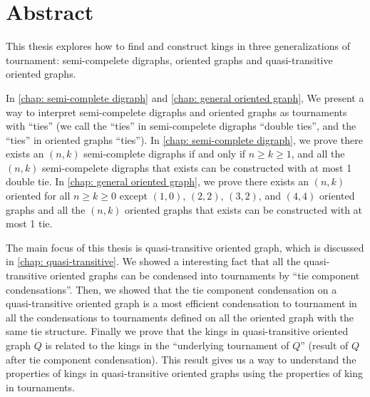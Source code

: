 \chapter{Abstract}

This thesis explores how to find and construct kings
in three generalizations of tournament:
semi-compelete digraphs, oriented graphs and
quasi-transitive oriented graphs.

In \cref{chap: semi-complete digraph} and \cref{chap: general oriented graph},
We present a way to interpret semi-compelete digraphs
and oriented graphs as tournaments with ``ties''
(we call the ``ties'' in semi-compelete digraphs ``double ties'',
and the ``ties'' in oriented graphs ``ties'').
In \cref{chap: semi-complete digraph},
we prove there exists an \((n, k)\) semi-complete digraphs
if and only if \(n \geq k \geq 1\),
and all the \((n, k)\) semi-compelete digraphs that exists
can be constructed with at most 1 double tie.
In \cref{chap: general oriented graph},
we prove there exists an \((n, k)\) oriented
for all \(n \geq k \geq 0\) except
\((1,0)\), \((2,2)\), \((3,2)\), and \((4,4)\) oriented graphs
and all the \((n, k)\) oriented graphs that exists
can be constructed with at most 1 tie.

The main focus of this thesis is quasi-transitive oriented graph,
which is discussed in \cref{chap: quasi-transitive}.
We showed a interesting fact that
all the quasi-transitive oriented graphs
can be condensed into tournaments by
``tie component condensations''.
Then, we showed that the tie component condensation
on a quasi-transitive oriented graph
is a most efficient condensation to tournament
in all the condensations to tournaments
defined on all the oriented graph with the same tie structure.
Finally we prove that the kings in
quasi-transitive oriented graph \(Q\) is related to
the kings in the ``underlying tournament of \(Q\)''
(result of \(Q\) after tie component condensation).
This result gives us a way to understand the
properties of kings in quasi-transitive oriented graphs
using the properties of king in tournaments.
